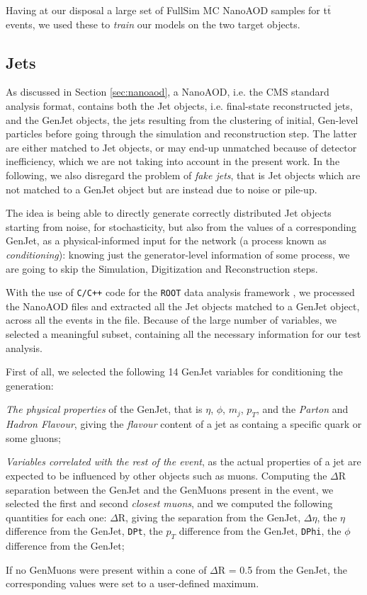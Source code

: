 Having at our disposal a large set of FullSim MC NanoAOD samples for t$\overline{\text{t}}$ events, we used these to \emph{train} our models on the two target objects.

\subsection{Jets}

As discussed in Section \ref{sec:nanoaod}, a NanoAOD, i.e. the CMS standard analysis format, contains both the Jet objects, i.e. final-state reconstructed jets, and the GenJet objects, the jets resulting from the clustering of initial, Gen-level particles before going through the simulation and reconstruction step. The latter are either matched to Jet objects, or may end-up unmatched because of detector inefficiency, which we are not taking into account in the present work. In the following, we also disregard the problem of \emph{fake jets}, that is Jet objects which are not matched to a GenJet object but are instead due to noise or pile-up.

The idea is being able to directly generate correctly distributed Jet objects starting from noise, for stochasticity,  but also from the values of a corresponding GenJet, as a physical-informed input for the network (a process known as \emph{conditioning}): knowing just the generator-level information of some process, we are going to skip the Simulation, Digitization and Reconstruction steps.


With the use of \texttt{C/C++} code for the \texttt{ROOT} data analysis framework \cite{Brun:491486}, we processed the NanoAOD files and extracted all the Jet objects matched to a GenJet object, across all the events in the file. Because of the large number of variables, we selected a meaningful subset, containing all the necessary information for our test analysis.

First of all, we selected the following 14 GenJet variables for conditioning the generation: 

\begin{outline}
\1 \emph{The physical properties} of the GenJet, that is $\eta$, $\phi$, $m_j$, $p_T$, and the \emph{Parton} and \emph{Hadron Flavour}, giving the \emph{flavour} content of a jet as containg a specific quark or some gluons;

\1 \emph{Variables correlated with the rest of the event}, as the actual properties of a jet are expected to be influenced by other objects such as muons. Computing the $\Delta$R separation between the GenJet and the GenMuons present in the event, we selected the first and second \emph{closest muons}, and we computed the following quantities for each one:
\2 $\Delta$R, giving the separation from the GenJet, $\Delta \eta$, the $\eta$ difference from the GenJet, \texttt{DPt}, the $p_T$ difference from the GenJet, \texttt{DPhi}, the $\phi$ difference from the GenJet;

\1 If no GenMuons were present within a cone of $\Delta$R = 0.5 from the GenJet, the corresponding values were set to a user-defined maximum.

\end{outline}

